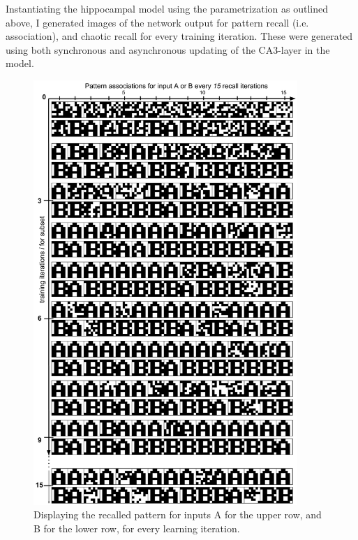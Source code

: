 Instantiating the hippocampal model using the parametrization as outlined above, I generated images of the network output for pattern recall (i.e. association), and chaotic recall for every training iteration. These were generated using both synchronous and asynchronous updating of the CA3-layer in the model.

\begin{figure}
    \centering
    \includegraphics[width=10cm]{fig/AB-pattern-associations-sync-tm0-dgw25}
    \caption{Displaying the recalled pattern for inputs A for the upper row, and B for the lower row, for every learning iteration.}
    \label{fig:pattern_associations_sync}
\end{figure}

